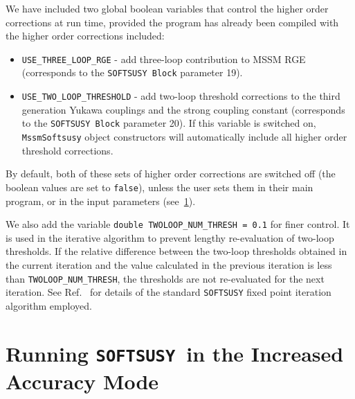 \documentclass[final,3p,times,pdflatex]{elsarticle}
\def\SOFTSUSY{{\tt SOFTSUSY}}
\def\code#1{{\tt #1}}
\begin{document}
We have included two global boolean variables that control the higher order
corrections  at run time, provided the program has already been compiled with 
the higher order corrections included:
\begin{itemize}
	\item \verb|USE_THREE_LOOP_RGE|  - add three-loop contribution to
          MSSM RGE (corresponds to the \code{SOFTSUSY Block} parameter 19). 
	\item \verb|USE_TWO_LOOP_THRESHOLD| - add two-loop threshold
          corrections to the third generation Yukawa couplings and the strong
          coupling constant 
          (corresponds to the \code{SOFTSUSY Block} parameter 20). If this
          variable is switched on, {\tt MssmSoftsusy} object constructors will 
          automatically include all higher order threshold corrections.
\end{itemize}
By default, both of these sets of higher order corrections are switched off 
(the boolean values are set to {\tt false}), unless the user sets them in
their main program, or in the input parameters (see~\ref{sec:run}). 

We also add the variable
\verb|double TWOLOOP_NUM_THRESH = 0.1| for finer control. It is 
          used in the iterative 
          algorithm to prevent lengthy re-evaluation of two-loop thresholds.
          If the relative difference between the two-loop thresholds obtained
          in the 
          current iteration and the value calculated in the previous
          iteration is less than
          \verb|TWOLOOP_NUM_THRESH|, the thresholds are not 
          re-evaluated for
          the next iteration.  
          See Ref.~\cite{Allanach:2001kg} for
          details of the standard {\tt SOFTSUSY} fixed point iteration 
          algorithm employed.
        
\section{Running \SOFTSUSY~in the Increased Accuracy Mode}  
\label{sec:run}
\end{document}
